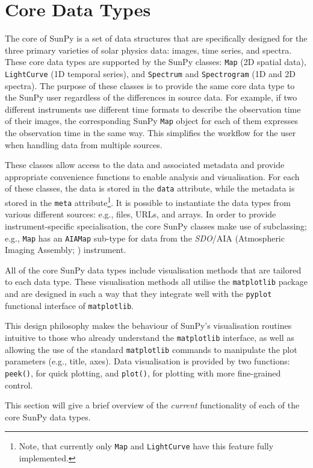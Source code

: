 \section{Core Data Types}\label{sec:DataTypes}

The core of SunPy is a set of data structures that are specifically
designed for the three primary varieties of solar physics data:
images, time series, and spectra. These core data types are supported
by the SunPy classes: \texttt{Map} (2D spatial data),
\texttt{LightCurve} (1D temporal series), and \texttt{Spectrum} and
\texttt{Spectrogram} (1D and 2D spectra).  The purpose of these
classes is to provide the same core data type to the SunPy user
regardless of the differences in source data.  For example, if two
different instruments use different time formats to describe the
observation time of their images, the corresponding SunPy \texttt{Map}
object for each of them expresses the observation time in the same
way.  This simplifies the workflow for the user when handling data
from multiple sources. 

These classes allow access to the data
and associated metadata and provide appropriate convenience functions to
enable analysis and visualisation. For each of these classes, the data is
stored in the \texttt{data} attribute, while the metadata is stored 
in the \texttt{meta} attribute\footnote{Note, that currently only \texttt{Map} and \texttt{LightCurve} have this feature 
fully implemented.}. 
It is possible to instantiate the
data types from various
different sources: e.g., files, URLs, and arrays.  
In order to provide instrument-specific specialisation, the core SunPy classes 
make use of subclassing; e.g., \texttt{Map} has an \texttt{AIAMap} 
sub-type for data from the \textit{SDO}/AIA (Atmospheric Imaging Assembly; \citealt{lemen2012}) instrument. 

All of the core SunPy data types 
include visualisation methods that are tailored to each data type. 
These visualisation methods all utilise the \texttt{matplotlib} 
package and are designed in such a way that they integrate well with 
the \texttt{pyplot} functional interface of \texttt{matplotlib}.

This design philosophy makes the behaviour of SunPy's visualisation 
routines intuitive to those who already understand the \texttt{matplotlib}
interface, as well as allowing the use of the standard 
\texttt{matplotlib} commands to manipulate the plot parameters (e.g., title, axes).
Data visualisation is provided by two functions: \texttt{peek()}, for quick 
plotting, and \texttt{plot()}, for plotting with more fine-grained control.

This section will give a brief overview of the \textit{current} functionality 
of each of the core SunPy data types.




